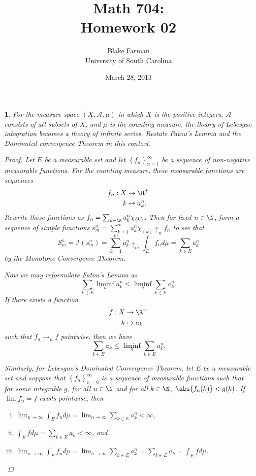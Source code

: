 \documentclass[12pt]{amsart}
\author{Blake Farman\\University of South Carolina}
\title{Math 704:\\Homework 02}
\date{March 28, 2013}
\begin{document}
\maketitle

\providecommand{\p}{\mathfrak{p}}
\providecommand{\m}{\mathfrak{m}}

\newtheorem{thm}{}
\newtheorem{lem}{Lemma}

\setcounter{thm}{8}

\begin{thm}\label{ex1}
    For the measure space $(X, \mathcal{A}, \mu)$ in which $X$ is the positive integers, $\mathcal{A}$ consists of all subsets of $X$, and $\mu$ is the counting measure, the theory of Lebesgue integration becomes a theory of infinite series.
    Restate Fatou's Lemma and the Dominated convergence Theorem in this context.
  \begin{proof}
    Let $E$ be a measurable set and let $\left\{f_n\right\}_{n = 1}^\infty$ be a sequence of non-negative measurable functions.
    For the counting measure, these measurable functions are sequences
    \begin{align*}
      f_n : X &\rightarrow \R^+\\
      k &\mapsto a_k^n.
    \end{align*}
    Rewrite these functions as $f_n = \sum_{k \in \N} a_k^n \chi_{\left\{k\right\}}$.
    Then for fixed $n \in \N$, form a sequence of simple functions $s_m^n = \sum_{k = 1}^m a_k^n \chi_{\left\{k\right\}} \uparrow_n f_n$ to see that
    $$S_m^n = \mathcal{I}(s_m^n) = \sum_{k = 1}^m a_k^n \uparrow_m \int_E f_n d\mu = \sum_{k \in E} a_k^n$$
    by the Monotone Convergence Theorem.
    
    Now we may reformulate Fatou's Lemma as 
    $$\sum_{k \in E} \liminf_n a_k^n \leq \liminf_n \sum_{k \in E} a_k^n.$$
    If there exists a function
    \begin{align*}
      f : X &\rightarrow \R^+\\
      k &\mapsto a_k
    \end{align*}
    such that $f_n \rightarrow_n f$ pointwise, then we have
    $$\sum_{k \in E} a_k \leq \liminf_n \sum_{k \in E} a_k^n.$$

    Similarly, for Lebesgue's Dominated Convergence Theorem, let $E$ be a measurable set and suppose that $\left\{f_n\right\}_{n = 0}^\infty$ is a sequence of measurable functions such that for some integrable $g$, for all $n \in \N$ and for all $k \in \N$, $\abs{f_n(k)} < g(k)$.
    If $\lim f_n = f$ exists pointwise, then
    \begin{enumerate}[(i)]
    \item
      $\lim_{n \rightarrow \infty} \int_E f_n d\mu = \lim_{n \rightarrow \infty} \sum_{k \in E} a_k^n< \infty$,
    \item
      $\int_E f d\mu = \sum_{k \in E} a_k < \infty$, and
    \item
      $\lim_{n \rightarrow \infty}\int_E f_n d\mu = \lim_{n \rightarrow \infty} \sum_{k \in E} a_k^n = \sum_{k \in E} a_k = \int_E f d\mu$.
    \end{enumerate}
  \end{proof}
\end{thm}
\end{document}
